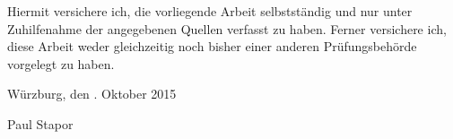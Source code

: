 \documentclass[
11pt,                          %
english                        %
]{book}
\begin{document}

%

{
  \footnotesize
  \renewcommand{\arraystretch}{0.5}
%  
%  
  
  
}


%

\cleardoublepage
\thispagestyle{empty}

\vspace*{1cm}

\begin{flushleft}
	Hiermit versichere ich, die vorliegende Arbeit selbstständig und nur unter 
	Zuhilfenahme der angegebenen Quellen verfasst zu haben. Ferner versichere ich, 
	diese Arbeit weder gleichzeitig noch bisher einer anderen Prüfungsbehörde 
	vorgelegt zu haben.

	\vspace{3cm}
	Würzburg, den \number\day. Oktober 2015

	\vspace{2cm}
	Paul Stapor
\end{flushleft}

\end{document}
